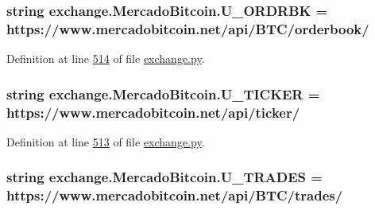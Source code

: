\subsubsection[{\texorpdfstring{U\+\_\+\+O\+R\+D\+R\+BK}{U_ORDRBK}}]{\setlength{\rightskip}{0pt plus 5cm}string exchange.\+Mercado\+Bitcoin.\+U\+\_\+\+O\+R\+D\+R\+BK = \textquotesingle{}https\+://www.\+mercadobitcoin.\+net/api/B\+TC/orderbook/\textquotesingle{}\hspace{0.3cm}{\ttfamily [static]}}\hypertarget{classexchange_1_1_mercado_bitcoin_a7dd22c2c0261557a694678d8057d2547}{}\label{classexchange_1_1_mercado_bitcoin_a7dd22c2c0261557a694678d8057d2547}


Definition at line \hyperlink{exchange_8py_source_l00514}{514} of file \hyperlink{exchange_8py_source}{exchange.\+py}.

\subsubsection[{\texorpdfstring{U\+\_\+\+T\+I\+C\+K\+ER}{U_TICKER}}]{\setlength{\rightskip}{0pt plus 5cm}string exchange.\+Mercado\+Bitcoin.\+U\+\_\+\+T\+I\+C\+K\+ER = \textquotesingle{}https\+://www.\+mercadobitcoin.\+net/api/{\bf ticker}/\textquotesingle{}\hspace{0.3cm}{\ttfamily [static]}}\hypertarget{classexchange_1_1_mercado_bitcoin_a310b7df5ae9e8a46bad918428c67d4e8}{}\label{classexchange_1_1_mercado_bitcoin_a310b7df5ae9e8a46bad918428c67d4e8}


Definition at line \hyperlink{exchange_8py_source_l00513}{513} of file \hyperlink{exchange_8py_source}{exchange.\+py}.

\subsubsection[{\texorpdfstring{U\+\_\+\+T\+R\+A\+D\+ES}{U_TRADES}}]{\setlength{\rightskip}{0pt plus 5cm}string exchange.\+Mercado\+Bitcoin.\+U\+\_\+\+T\+R\+A\+D\+ES = \textquotesingle{}https\+://www.\+mercadobitcoin.\+net/api/B\+TC/{\bf trades}/\textquotesingle{}\hspace{0.3cm}{\ttfamily [static]}}\hypertarget{classexchange_1_1_mercado_bitcoin_a20ad6407ef07ab8a55d3c022d1512a5d}{}\label{classexchange_1_1_mercado_bitcoin_a20ad6407ef07ab8a55d3c022d1512a5d}


